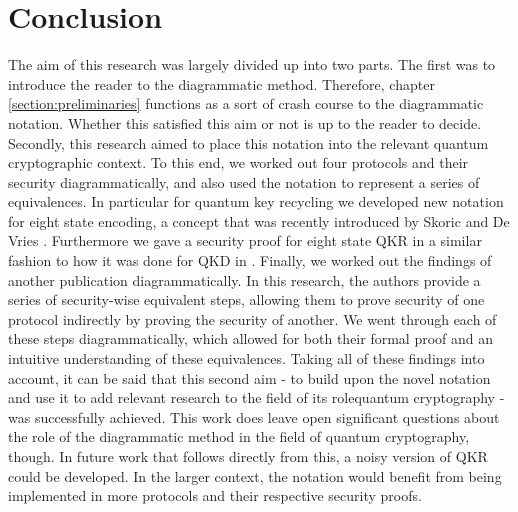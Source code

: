 \documentclass[]{article}
\begin{document}
\section{Conclusion}

The aim of this research was largely divided up into two parts. The first was to introduce the reader to the diagrammatic method. Therefore, chapter \ref{section:preliminaries} functions as a sort of crash course to the diagrammatic notation. Whether this satisfied this aim or not is up to the reader to decide. Secondly, this research aimed to place this notation into the relevant quantum cryptographic context. To this end, we worked out four protocols and their security diagrammatically, and also used the notation to represent a series of equivalences. In particular for quantum key recycling we developed new notation for eight state encoding, a concept that was recently introduced by Skoric and De Vries \cite{DeVries2016}. Furthermore we gave a security proof for eight state QKR in a similar fashion to how it was done for QKD in \cite{Kissinger2017}. Finally, we worked out the findings of another publication \cite{Leermakers2019} diagrammatically. In this research, the authors provide a series of security-wise equivalent steps, allowing them to prove security of one protocol indirectly by proving the security of another. We went through each of these steps diagrammatically, which allowed for both their formal proof and an intuitive understanding of these equivalences. Taking all of these findings into account, it can be said that this second aim - to build upon the novel notation and use it to add relevant research to the field of its rolequantum cryptography - was successfully achieved. This work does leave open significant questions about the role of the diagrammatic method in the field of quantum cryptography, though. In future work that follows directly from this, a noisy version of QKR could be developed. In the larger context, the notation would benefit from being implemented in more protocols and their respective security proofs.




\appendix
\end{document}

